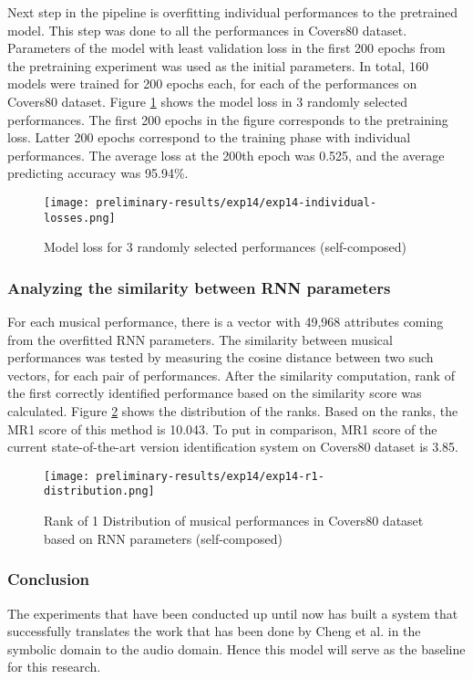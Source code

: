 \documentclass[../main.tex]{subfiles}
\begin{document}
\par
Next step in the pipeline is overfitting individual performances to the pretrained model. This step was done to all the performances in Covers80 dataset. Parameters of the model with least validation loss in the first 200 epochs from the pretraining experiment was used as the initial parameters. In total, 160 models were trained for 200 epochs each, for each of the performances on Covers80 dataset. Figure \ref{fig:exp14-performance} shows the model loss in 3 randomly selected performances. The first 200 epochs in the figure corresponds to the pretraining loss. Latter 200 epochs correspond to the training phase with individual performances. The average loss at the 200th epoch was 0.525, and the average predicting accuracy was 95.94\%.


\begin{figure}[H]
    \centering
    \texttt{[image: preliminary-results/exp14/exp14-individual-losses.png]}
    \caption{Model loss for 3 randomly selected performances (self-composed)}
    \label{fig:exp14-performance}
\end{figure}


\subsubsection{Analyzing the similarity between RNN parameters}

\par
For each musical performance, there is a vector with 49,968 attributes coming from the overfitted \gls{RNN} parameters. The similarity between musical performances was tested by measuring the cosine distance between two such vectors, for each pair of performances. After the similarity computation, rank of the first correctly identified performance based on the similarity score was calculated. Figure \ref{fig:exp14-r1-distribution} shows the distribution of the ranks. Based on the ranks, the \gls{MR1} score of this method is 10.043. To put in comparison, \gls{MR1} score of the current state-of-the-art version identification system \cite{jiang_yang_chen_2020} on Covers80 dataset is 3.85.

\begin{figure}[H]
    \centering
    \texttt{[image: preliminary-results/exp14/exp14-r1-distribution.png]}
    \caption{Rank of 1 Distribution of musical performances in Covers80 dataset based on RNN parameters (self-composed)}
    \label{fig:exp14-r1-distribution}
\end{figure}

\subsubsection{Conclusion}

\par
The experiments that have been conducted up until now has built a system that successfully translates the work that has been done by Cheng et al. in the symbolic domain \cite{tian_cheng_comparing_2018} to the audio domain. Hence this model will serve as the baseline for this research.
\end{document}

